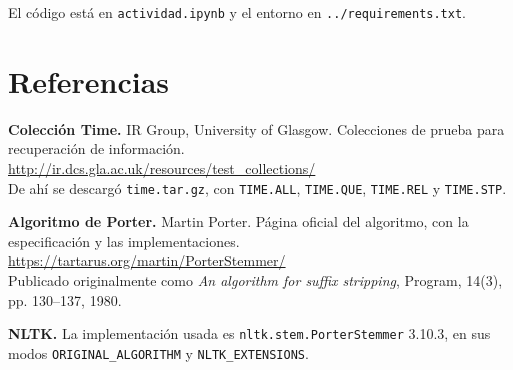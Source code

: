 \documentclass[11pt,letterpaper]{article}
\begin{document}
El código está en \texttt{actividad.ipynb} y el entorno en
\texttt{../requirements.txt}.

\section*{Referencias}

\begin{enumerate}[label={[\arabic*]}, itemsep=0.3em, leftmargin=*]
    \item \textbf{Colección Time.} IR Group, University of Glasgow.
          Colecciones de prueba para recuperación de información.\\
          \url{http://ir.dcs.gla.ac.uk/resources/test_collections/}\\
          De ahí se descargó \texttt{time.tar.gz}, con
          \texttt{TIME.ALL}, \texttt{TIME.QUE}, \texttt{TIME.REL} y
          \texttt{TIME.STP}.
    \item \textbf{Algoritmo de Porter.} Martin Porter. Página oficial
          del algoritmo, con la especificación y las
          implementaciones.\\
          \url{https://tartarus.org/martin/PorterStemmer/}\\
          Publicado originalmente como \emph{An algorithm for suffix
          stripping}, Program, 14(3), pp. 130--137, 1980.
    \item \textbf{NLTK.} La implementación usada es
          \texttt{nltk.stem.PorterStemmer} 3.10.3, en sus modos
          \texttt{ORIGINAL\_ALGORITHM} y \texttt{NLTK\_EXTENSIONS}.
\end{enumerate}

\appendix
\end{document}
